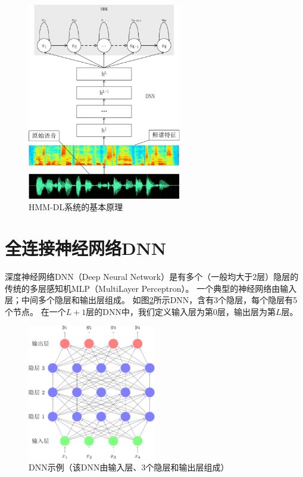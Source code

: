 \begin{figure}
\centering
\includegraphics[width=0.6\textwidth]{figures/chapter3/hmmdnn-crop}
\caption{HMM-DL系统的基本原理}
\label{fig:hmmdnn}
\end{figure}


\section{全连接神经网络DNN}

深度神经网络DNN（Deep Neural Network）是有多个（一般均大于2层）隐层的传统的多层感知机MLP（MultiLayer Perceptron）。
一个典型的神经网络由输入层；中间多个隐层和输出层组成。
如图\ref{fig:dnn}所示DNN，含有3个隐层，每个隐层有5个节点。
在一个$L+1$层的DNN中，我们定义输入层为第$0$层，输出层为第$L$层。

\begin{figure}
\centering
\includegraphics[width=0.5\textwidth]{figures/chapter3/dnn-crop}
\caption{DNN示例（该DNN由输入层、3个隐层和输出层组成）}
\label{fig:dnn}
\end{figure}

